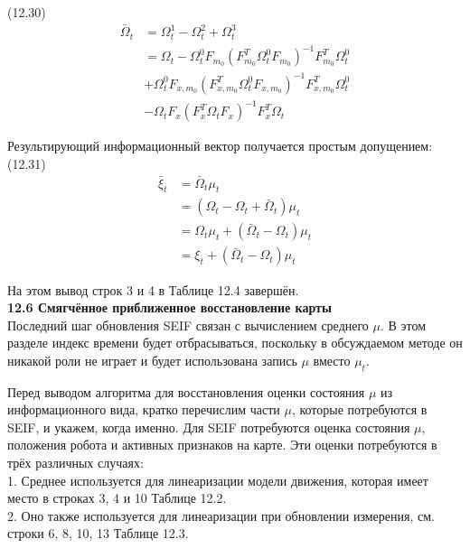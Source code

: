 \documentclass[10pt,a4paper]{article}
\begin{document}
(12.30)
\begin{equation*}
\begin{split}
\bar{\varOmega}_t&=\varOmega_t^1-\varOmega_t^2+\varOmega_t^3\\
&=\varOmega_t-\varOmega_t^0F_{m_0}(F_{m_0}^T\varOmega_t^0F_{m_0})^{-1}F_{m_0}^T\varOmega_t^0\\
&+\varOmega_t^0F_{x,m_0}(F_{x,m_0}^T\varOmega_t^0F_{x,m_0})^{-1}F_{x,m_0}^T\varOmega_t^0\\
&-\varOmega_tF_x(F_x^T\varOmega_tF_x)^{-1}F_x^T\varOmega_t
\end{split}
\end{equation*}

Результирующий информационный вектор получается простым допущением:\\

(12.31)
\begin{equation*}
\begin{split}
\bar{\xi}_t&=\bar{\varOmega}_t\mu_t\\
&=(\varOmega_t-\varOmega_t+\bar{\varOmega}_t)\mu_t\\
&=\varOmega_t\mu_t+(\bar{\varOmega}_t-\varOmega_t)\mu_t\\
&=\xi_t+(\bar{\varOmega}_t-\varOmega_t)\mu_t
\end{split}
\end{equation*}

На этом вывод строк 3 и 4 в Таблице 12.4 завершён.\\

\textbf{12.6	Смягчённое приближенное восстановление карты}\\

Последний шаг обновления SEIF связан с вычислением среднего $\mu$. В этом разделе индекс времени будет отбрасываться, поскольку в обсуждаемом методе он никакой роли не играет и будет использована запись $\mu$ вместо $\mu_t$.

Перед выводом алгоритма для восстановления оценки состояния $\mu$ из информационного вида, кратко перечислим части $\mu$, которые потребуются в SEIF, и укажем, когда именно. Для SEIF потребуются оценка состояния $\mu$, положения робота и активных признаков на карте. Эти оценки потребуются в трёх различных случаях:\\

1.	Среднее используется для линеаризации модели движения, которая имеет место в строках 3, 4 и 10 Таблице 12.2.\\

2.	Оно также используется для линеаризации при обновлении измерения, см. строки 6, 8, 10, 13 Таблице 12.3.\\
\end{document}
